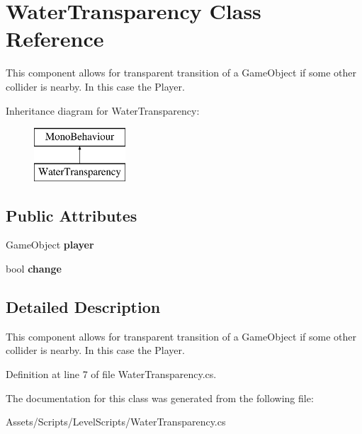 \hypertarget{class_water_transparency}{\section{Water\+Transparency Class Reference}
\label{class_water_transparency}
}


This component allows for transparent transition of a Game\+Object if some other collider is nearby. In this case the Player.  


Inheritance diagram for Water\+Transparency\+:\begin{figure}[H]
\begin{center}
\leavevmode
\includegraphics[height=2.000000cm]{class_water_transparency}
\end{center}
\end{figure}
\subsection*{Public Attributes}
\begin{DoxyCompactItemize}
\item 
\hypertarget{class_water_transparency_ac96cfbea16b8832ac2ac3ca56aada830}{Game\+Object {\bfseries player}}\label{class_water_transparency_ac96cfbea16b8832ac2ac3ca56aada830}

\item 
\hypertarget{class_water_transparency_a4b2b69526abb0b842ed31bef14e236f0}{bool {\bfseries change}}\label{class_water_transparency_a4b2b69526abb0b842ed31bef14e236f0}

\end{DoxyCompactItemize}


\subsection{Detailed Description}
This component allows for transparent transition of a Game\+Object if some other collider is nearby. In this case the Player. 



Definition at line 7 of file Water\+Transparency.\+cs.



The documentation for this class was generated from the following file\+:\begin{DoxyCompactItemize}
\item 
Assets/\+Scripts/\+Level\+Scripts/Water\+Transparency.\+cs\end{DoxyCompactItemize}
